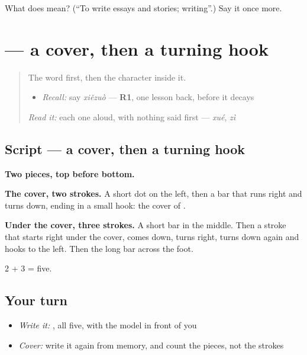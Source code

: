 \begin{tcolorbox}[breakable,colback=teal!4,colframe=teal!35!black,title={Before you move on}]
What does  mean? (\textquotedblleft{}To write essays and stories; writing\textquotedblright{}.) Say it once more.
\end{tcolorbox}
\section[\texorpdfstring{\zh{写} (xiě)}{写 (xiě)}]{ — a cover, then a turning hook}

\label{lesson:ZH-W251-xie-write}



\begin{quote}
The word first, then the character inside it.

\begin{itemize}
\raggedright
  \item \emph{Recall:} say \emph{xiězuò} — \textbf{R1}, one lesson back, before it decays
\end{itemize}

\begin{quote}
 
\end{quote}

\emph{Read it:} each one aloud, with nothing said first — \emph{xué}, \emph{zì}
\end{quote}

\subsection*{Script — a cover, then a turning hook}

\begin{quote}
\end{quote}

\textbf{Two pieces, top before bottom.}

\textbf{The cover, two strokes.} A short dot on the left, then a bar that runs right and turns down, ending in a small hook: the cover of .

\textbf{Under the cover, three strokes.} A short bar in the middle. Then a stroke that starts right under the cover, comes down, turns right, turns down again and hooks to the left. Then the long bar across the foot.

2 + 3 = five.

\subsection*{Your turn}
\begin{itemize}
\raggedright
  \item \emph{Write it:} , all five, with the model in front of you
  \item \emph{Cover:} write it again from memory, and count the pieces, not the strokes
\end{itemize}

